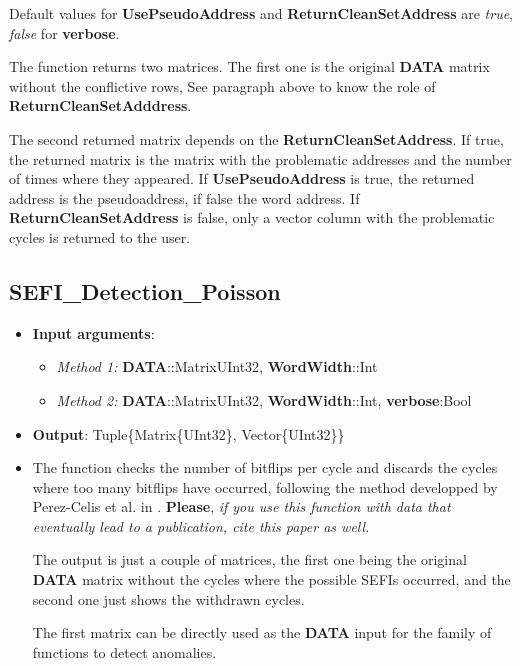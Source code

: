\begin{itemize}
		Default values for \textbf{UsePseudoAddress} and \textbf{ReturnCleanSetAddress} are \textit{true}, \textit{false} for \textbf{verbose}.
		
		The function returns two matrices. The first one is the original \textbf{DATA} matrix without the conflictive rows, See paragraph above to know the role of \textbf{ReturnCleanSetAdddress}. 
		
		The second returned matrix depends on the \textbf{ReturnCleanSetAddress}. If true, the returned matrix is the matrix with the problematic addresses and the number of times where they appeared.  If \textbf{UsePseudoAddress} is true, the returned address is the pseudoaddress, if false the word address.  If  \textbf{ReturnCleanSetAddress} is false, only a vector column with the problematic cycles is returned to the user.
		
	\end{itemize}
\subsection*{SEFI\_Detection\_Poisson}\label{Fun:SEFI_Detection_Poisson}

	\begin{itemize}
		\item \textbf{Input arguments}: 
		\begin{itemize}			
			\item \textit{Method 1:} \textbf{DATA}::Matrix{UInt32},
			\textbf{WordWidth}::Int
			\item \textit{Method 2:} \textbf{DATA}::Matrix{UInt32},
			\textbf{WordWidth}::Int,
			\textbf{verbose}:Bool
		\end{itemize}
		\item \textbf{Output}: Tuple\{Matrix\{UInt32\}, Vector\{UInt32\}\}
		
		\item The function checks the number of bitflips per cycle and discards the cycles where too many bitflips have occurred, following the method developped by Perez-Celis et al. in \cite{Perez-Celis2021}. \textbf{Please}, \textit{if you use this function with data that eventually lead to a publication, cite this paper as well.}
		
		The output is just a couple of matrices, the first one being the original \textbf{DATA} matrix without the cycles where the possible SEFIs occurred, and the second one just shows the withdrawn cycles.
		
		The first matrix can be directly used as the \textbf{DATA} input for the family of functions to detect anomalies.
	\end{itemize}


